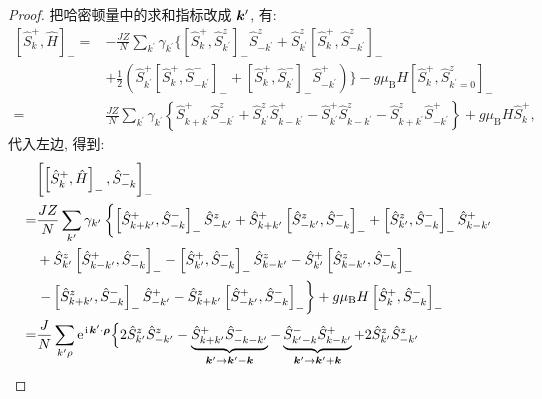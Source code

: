 \begin{proof}
把哈密顿量中的求和指标改成 $\boldsymbol{k}^{\prime}$, 有:
\begin{align}
\left[\hat{S}_k^{+}, \hat{H}\right]_{-}=& - \frac{JZ}{N} \sum_{k^{\prime}} \gamma_{k^{\prime}}\Big\{\left[\hat{S}_k^{+}, \hat{S}_{k^{\prime}}^z\right]_{-} \hat{S}_{-k^{\prime}}^z+\hat{S}_{k^{\prime}}^z\left[\hat{S}_k^{+}, \hat{S}_{-k^{\prime}}^z\right]_{-} \nonumber\\
& +\frac{1}{2}\left(\hat{S}_{k^{\prime}}^{+}\left[\hat{S}_k^{+}, \hat{S}_{-k^{\prime}}^{-}\right]_{-}+\left[\hat{S}_k^{+}, \hat{S}_{k^{\prime}}^{-}\right]_{-} \hat{S}_{-k^{\prime}}^{+}\right)\Big\}-g \mu_{\mathrm{B}} H\left[\hat{S}_k^{+}, \hat{S}_{k^{\prime}=0}^z\right]_{-} \nonumber\\
 =& \frac{JZ}{N} \sum_{k^{\prime}} \gamma_{k^{\prime}}\left\{\hat{S}_{k+k^{\prime}}^{+} \hat{S}_{-k^{\prime}}^z+\hat{S}_{k^{\prime}}^z \hat{S}_{k-k^{\prime}}^{+}-\hat{S}_{k^{\prime}}^{+} \hat{S}_{k-k^{\prime}}^z-\hat{S}_{k+k^{\prime}}^z \hat{S}_{-k^{\prime}}^{+}\right\}+g \mu_{\mathrm{B}} H \hat{S}_k^{+} ,
\end{align}
代入左边, 得到:
\begin{align}
& {\left[\left[\hat{S}_k^{+}, \hat{H}\right]_{-}, \hat{S}_{-k}^{-}\right]_{-}} \nonumber\\
 =& \frac{JZ}{N} \sum_{k^{\prime}} \gamma_{k^{\prime}}\left\{\left[\hat{S}_{k+k^{\prime}}^{+}, \hat{S}_{-k}^{-}\right]_{-} \hat{S}_{-k^{\prime}}^z+\hat{S}_{k+k^{\prime}}^{+}\left[\hat{S}_{-k^{\prime}}^z, \hat{S}_{-k}^{-}\right]_{-}+\left[\hat{S}_{k^{\prime}}^z, \hat{S}_{-k}^{-}\right]_{-} \hat{S}_{k-k^{\prime}}^{+}\right. \nonumber\\
&+\hat{S}_{k^{\prime}}^z\left[\hat{S}_{k-k^{\prime}}^{+}, \hat{S}_{-k}^{-}\right]_{-}-\left[\hat{S}_{k^{\prime}}^{+}, \hat{S}_{-k}^{-}\right]_{-} \hat{S}_{k-k^{\prime}}^z-\hat{S}_{k^{\prime}}^{+}\left[\hat{S}_{k-k^{\prime}}^z, \hat{S}_{-k}^{-}\right]_{-}\nonumber\\
& \left.-\left[\hat{S}_{k+k^{\prime}}^z, \hat{S}_{-k}^{-}\right]_{-} \hat{S}_{-k^{\prime}}^{+}-\hat{S}_{k+k^{\prime}}^z\left[\hat{S}_{-k^{\prime}}^{+}, \hat{S}_{-k}^{-}\right]_{-}\right\}+g \mu_{\mathrm{B}} H\left[\hat{S}_k^{+}, \hat{S}_{-k}^{-}\right]_{-} \nonumber\\
 =&\frac{J}{N} \sum_{k^{\prime} \rho} \mathrm{e}^{\ii \vct k^{\prime} \cdot \vct \rho}\Big\{2 \hat{S}_{k^{\prime}}^z \hat{S}_{-k^{\prime}}^z-\underbrace{\hat{S}_{k+k^{\prime}}^{+} \hat{S}_{-k-k^{\prime}}^{-}}_{\vct k^{\prime} \rightarrow \vct k^{\prime}-\vct k}-\underbrace{\hat{S}_{k^{\prime}-k}^{-} \hat{S}_{k-k^{\prime}}^{+}}_{\vct k^{\prime} \rightarrow \vct k^{\prime}+\vct k}+2 \hat{S}_{k^{\prime}}^z \hat{S}_{-k^{\prime}}^z \nonumber\\

\end{align}
\end{proof}
